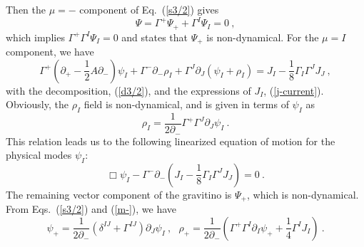 \documentclass[a4paper,12pt]{article}
\numberwithin{equation}{section}
\begin{document}
Then the $\mu = -$ component of Eq.~(\ref{s3/2}) gives
\begin{equation}
\Psi = \Gamma^+ \Psi_+ + \Gamma^I \Psi_I = 0 ~,
\label{m-}
\end{equation}
which implies $\Gamma^+ \Gamma^I \Psi_I = 0$ and states that $\Psi_+$
is non-dynamical.  For the $\mu = I$ component, we have
\begin{equation}
\Gamma^+ ( \partial_+ - \frac{1}{2} A \partial_- ) \psi_I
       + \Gamma^- \partial_- \rho_I
       + \Gamma^J \partial_J (\psi_I + \rho_I)
 = J_I - \frac{1}{8} \Gamma_I \Gamma^J J_J ~,
\end{equation}
with the decomposition, (\ref{d3/2}), and the expressions of $J_I$,
(\ref{j-current}).  Obviously, the $\rho_I$ field is non-dynamical,
and is given in terms of $\psi_I$ as
\begin{equation}
\rho_I = \frac{1}{2 \partial_-}
        \Gamma^+ \Gamma^J \partial_J \psi_I ~.
\end{equation}
This relation leads us to the following linearized equation of motion
for the physical modes $\psi_I$:
\begin{equation}
\Box \psi_I - \Gamma^- \partial_-
(J_I - \frac{1}{8} \Gamma_I \Gamma^J J_J ) = 0 ~.
\label{gravi-eq}
\end{equation}
The remaining vector component of the gravitino is $\Psi_+$, which is
non-dynamical.  From Eqs.~(\ref{s3/2}) and (\ref{m-}), we have
\begin{equation}
\psi_+ = \frac{1}{2 \partial_-}
   ( \delta^{IJ} + \Gamma^{IJ} ) \partial_J \psi_I ~,~~~
\rho_+ = \frac{1}{2 \partial_-}
  ( \Gamma^+ \Gamma^I \partial_I \psi_+
   + \frac{1}{4} \Gamma^I J_I ) ~.
\end{equation}
\end{document}
